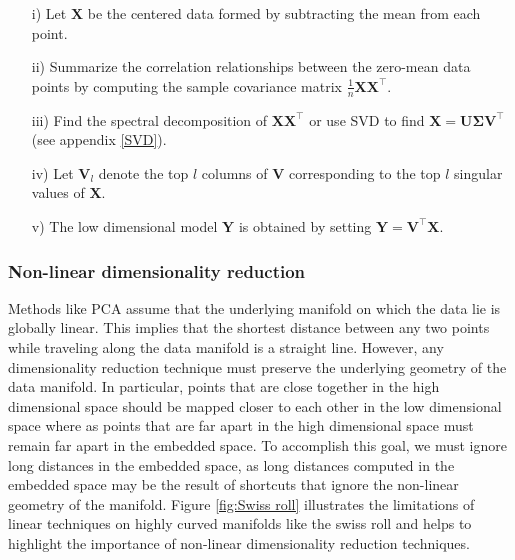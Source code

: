 \begin{itemize}
\item[i)] Let $\textbf{X}$ be the centered data formed by subtracting the mean from each point.
\item[ii)] Summarize the correlation relationships between the zero-mean data points by computing the sample covariance matrix $\frac{1}{n}\textbf{XX}^{\top}.$
\item[iii)] Find the spectral decomposition of $\textbf{XX}^{\top}$ or 
use SVD to find $\textbf{X} = \bm{U\Sigma V^{\top}}$  (see appendix \ref{SVD}).
\item[iv)] Let $\bm{V}_{l}$ denote the top $l$ columns of $\textbf{V}$ corresponding to the  top $l$ singular values of $\textbf{X}$.
\item[v)] The low dimensional model $\textbf{Y}$ is obtained by setting 
$\textbf{Y} = \textbf{V}^{\top}\textbf{X}$.
\end{itemize}

\subsubsection{Non-linear dimensionality reduction}

Methods like PCA assume that the underlying manifold on which the data lie is globally linear. This implies that the shortest distance between any two points while traveling along the data manifold is a straight line.
However, any dimensionality reduction technique must preserve the underlying geometry of the data manifold. In particular, points that are close together in the high dimensional space should be mapped closer to each other in the low dimensional space where as points that are far apart in the high dimensional space must remain far apart in the embedded space. To accomplish this goal, we must ignore long distances in the embedded space, as long distances computed in the embedded space
may be the result of shortcuts that ignore the non-linear geometry of the manifold.
Figure \ref{fig:Swiss roll} illustrates the limitations of linear techniques on highly curved manifolds like the swiss roll and helps to highlight the importance of non-linear dimensionality reduction techniques.

